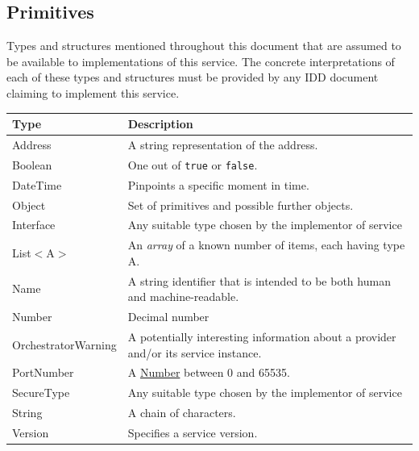\documentclass[a4paper]{arrowhead}
\newcommand{\pdef}[1]{{\textcolor{ArrowheadGrey}{#1\label{sec:model:primitives:#1}\label{sec:model:primitives:#1s}\label{sec:model:primitives:#1es}}}}
\newcommand{\pref}[1]{{\textcolor{ArrowheadGrey}{\hyperref[sec:model:primitives:#1]{#1}}}}
\begin{document}
\subsection{Primitives}
\label{sec:model:primitives}

Types and structures mentioned throughout this document that are assumed to be available to implementations of this service.
The concrete interpretations of each of these types and structures must be provided by any IDD document claiming to implement this service.


\begin{table}[ht!]
\begin{tabularx}{\textwidth}{| p{4cm} | X |} \hline
\rowcolor{gray!33} Type & Description \\ \hline
\pdef{Address}          & A string representation of the address. \\ \hline
\pdef{Boolean}          & One out of \texttt{true} or \texttt{false}. \\ \hline
\pdef{DateTime}         & Pinpoints a specific moment in time. \\ \hline
\pdef{Object}           & Set of primitives and possible further objects. \\ \hline
\pdef{Interface}        & Any suitable type chosen by the implementor of service \\ \hline
\pdef{List}$<$A$>$      & An \textit{array} of a known number of items, each having type A. \\ \hline
\pdef{Name}             & A string identifier that is intended to be both human and machine-readable. \\ \hline
\pdef{Number}           & Decimal number \\ \hline
\pdef{OrchestratorWarning} & A potentially interesting information about a provider and/or its service instance. \\ \hline
\pdef{PortNumber}       & A \pref{Number} between 0 and 65535. \\ \hline
\pdef{SecureType}       & Any suitable type chosen by the implementor of service \\ \hline
\pdef{String}           & A chain of characters. \\ \hline
\pdef{Version}          & Specifies a service version. \\ \hline
\end{tabularx}
\end{table}

\newpage



\end{document}
